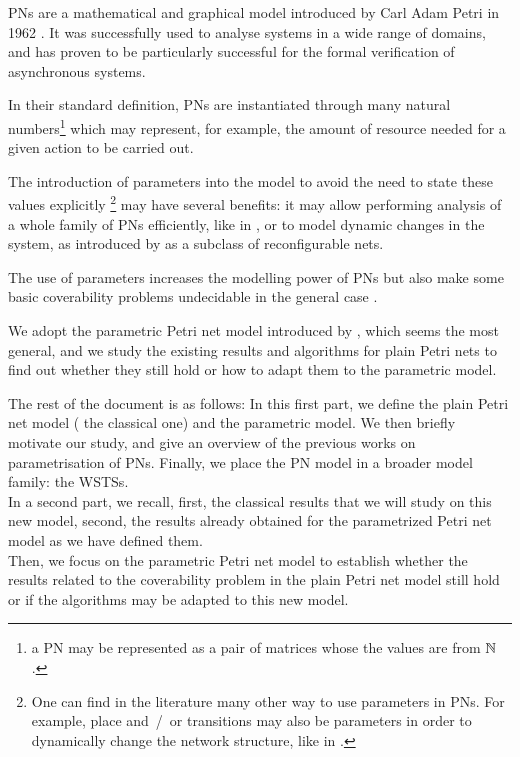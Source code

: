\acp{PN} are a mathematical and graphical model introduced by Carl Adam Petri in 1962 \citep{Petri62,Petri66}.
It was successfully used to analyse systems in a wide range of domains, and has proven to be particularly successful for the formal verification of asynchronous systems.

In their standard definition, \acp{PN} are instantiated through many natural numbers\footnote{ a \ac{PN} may be represented as a pair of matrices whose the values are from $\mathbb{N}$.} which may represent, for example, the amount of resource needed for a given action to be carried out.

The introduction of parameters into the model to avoid the need to state these values explicitly%
\footnote{One can find in the literature many other way to use parameters in \acp{PN}. For example, place and~/~or transitions may also be parameters in order to dynamically change the network structure, like in \cite{Christensen97}.}
may have several benefits:
it may allow performing analysis of a whole family of \acp{PN} efficiently, like in \cite{Abdulla13}, or to model dynamic changes in the system, as introduced by \cite{Badouel99} as a subclass of reconfigurable nets.

The use of parameters increases the modelling power of \acp{PN} but also make some basic coverability problems undecidable in the general case \cite{David17}.

We adopt the parametric Petri net model introduced by \cite{David17}, which seems the most general, and we study the existing results and algorithms for plain Petri nets to find out whether they still hold or how to adapt them to the parametric model.

The rest of the document is as follows:
In this first part, we define the plain Petri net model ( the classical one) and the parametric model.
We then briefly motivate our study,  and give an overview of the previous works on parametrisation of \acp{PN}.
Finally, we place the \ac{PN} model in a broader model family: the \acp{WSTS}.\\
In a second part, we recall, first, the classical results that we will study on this new model, second, the results already obtained for the parametrized Petri net model as we have defined them.\\
Then, we focus on the parametric Petri net model to establish whether the results related to the coverability problem in the plain Petri net model still hold or if the algorithms may be adapted to this new model.

\acresetall
